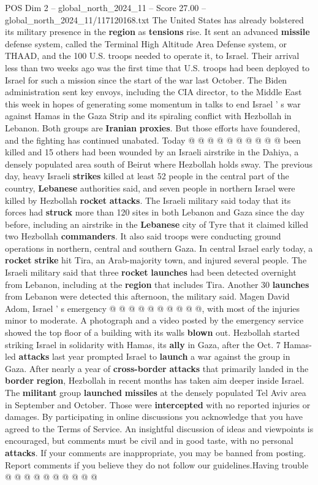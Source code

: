 \begin{textsample}{POS Dim 2 – global\_north\_2024\_11 – Score 27.00 – global\_north\_2024\_11/117120168.txt}
The United States has already bolstered its military presence in the \textbf{region} as \textbf{tensions} rise.
It sent an advanced \textbf{missile} defense system, called the Terminal High Altitude Area Defense system, or THAAD, and the 100 U.S. troops needed to operate it, to Israel.
Their arrival less than two weeks ago was the first time that U.S. troops had been deployed to Israel for such a mission since the start of the war last October.
The Biden administration sent key envoys, including the CIA director, to the Middle East this week in hopes of generating some momentum in talks to end Israel ' s war against Hamas in the Gaza Strip and its spiraling conflict with Hezbollah in Lebanon.
Both groups are \textbf{Iranian} \textbf{proxies}.
But those efforts have foundered, and the fighting has continued unabated.
Today @ @ @ @ @ @ @ @ @ @ been killed and 15 others had been wounded by an Israeli airstrike in the Dahiya, a densely populated area south of Beirut where Hezbollah holds sway.
The previous day, heavy Israeli \textbf{strikes} killed at least 52 people in the central part of the country, \textbf{Lebanese} authorities said, and seven people in northern Israel were killed by Hezbollah \textbf{rocket} \textbf{attacks}.
The Israeli military said today that its forces had \textbf{struck} more than 120 sites in both Lebanon and Gaza since the day before, including an airstrike in the \textbf{Lebanese} city of Tyre that it claimed killed two Hezbollah \textbf{commanders}.
It also said troops were conducting ground operations in northern, central and southern Gaza.
In central Israel early today, a \textbf{rocket} \textbf{strike} hit Tira, an Arab-majority town, and injured several people.
The Israeli military said that three \textbf{rocket} \textbf{launches} had been detected overnight from Lebanon, including at the \textbf{region} that includes Tira.
Another 30 \textbf{launches} from Lebanon were detected this afternoon, the military said.
Magen David Adom, Israel ' s emergency @ @ @ @ @ @ @ @ @ @, with most of the injuries minor to moderate.
A photograph and a video posted by the emergency service showed the top floor of a building with its walls \textbf{blown} out.
Hezbollah started striking Israel in solidarity with Hamas, its \textbf{ally} in Gaza, after the Oct. 7 Hamas-led \textbf{attacks} last year prompted Israel to \textbf{launch} a war against the group in Gaza.
After nearly a year of \textbf{cross-border} \textbf{attacks} that primarily landed in the \textbf{border} \textbf{region}, Hezbollah in recent months has taken aim deeper inside Israel.
The \textbf{militant} group \textbf{launched} \textbf{missiles} at the densely populated Tel Aviv area in September and October.
Those were \textbf{intercepted} with no reported injuries or damages.
By participating in online discussions you acknowledge that you have agreed to the Terms of Service.
An insightful discussion of ideas and viewpoints is encouraged, but comments must be civil and in good taste, with no personal \textbf{attacks}.
If your comments are inappropriate, you may be banned from posting.
Report comments if you believe they do not follow our guidelines.Having trouble @ @ @ @ @ @ @ @ @ @


\end{textsample}
